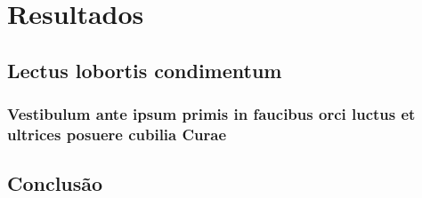 \documentclass[
	12pt,				%
	twoside,			%
	a4paper,			%
	english,			%
	french,				%
	spanish,			%
	brazil				%
	]{abntex2}
\begin{document}
\part{Resultados}

\chapter{Lectus lobortis condimentum}

\section{Vestibulum ante ipsum primis in faucibus orci luctus et ultrices
posuere cubilia Curae}


\chapter{Conclusão}


\postextual



%
%

\end{document}
